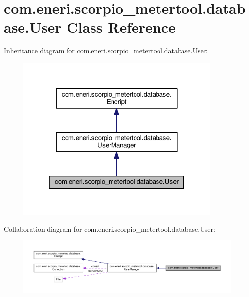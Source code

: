 \hypertarget{classcom_1_1eneri_1_1scorpio__metertool_1_1database_1_1_user}{}\section{com.\+eneri.\+scorpio\+\_\+metertool.\+database.\+User Class Reference}
\label{classcom_1_1eneri_1_1scorpio__metertool_1_1database_1_1_user}


Inheritance diagram for com.\+eneri.\+scorpio\+\_\+metertool.\+database.\+User\+:
\nopagebreak
\begin{figure}[H]
\begin{center}
\leavevmode
\includegraphics[width=286pt]{classcom_1_1eneri_1_1scorpio__metertool_1_1database_1_1_user__inherit__graph}
\end{center}
\end{figure}


Collaboration diagram for com.\+eneri.\+scorpio\+\_\+metertool.\+database.\+User\+:
\nopagebreak
\begin{figure}[H]
\begin{center}
\leavevmode
\includegraphics[width=350pt]{classcom_1_1eneri_1_1scorpio__metertool_1_1database_1_1_user__coll__graph}
\end{center}
\end{figure}

